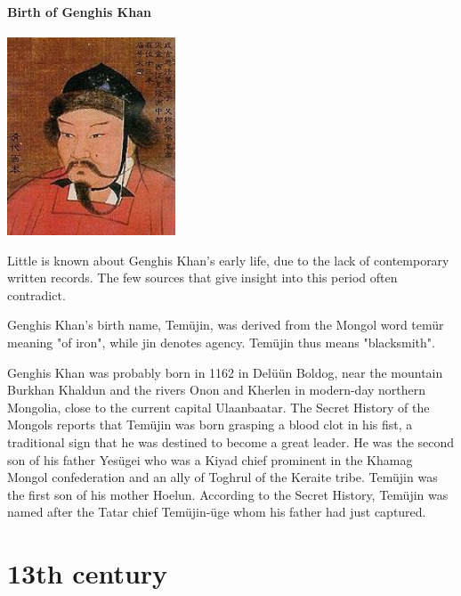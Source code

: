\documentclass[11pt]{report}
\begin{document}
\subsection{Birth of Genghis Khan}
\vspace{2mm}\begin{center}\includegraphics[width=5cm]{./img/gengishKhan.jpg}\end{center}
Little is known about Genghis Khan's early life, due to the lack of contemporary written records. The few sources that give insight into this period often contradict.

Genghis Khan's birth name, Temüjin, was derived from the Mongol word temür meaning "of iron", while jin denotes agency. Temüjin thus means "blacksmith".

Genghis Khan was probably born in 1162 in Delüün Boldog, near the mountain Burkhan Khaldun and the rivers Onon and Kherlen in modern-day northern Mongolia, close to the current capital Ulaanbaatar. The Secret History of the Mongols reports that Temüjin was born grasping a blood clot in his fist, a traditional sign that he was destined to become a great leader. He was the second son of his father Yesügei who was a Kiyad chief prominent in the Khamag Mongol confederation and an ally of Toghrul of the Keraite tribe. Temüjin was the first son of his mother Hoelun. According to the Secret History, Temüjin was named after the Tatar chief Temüjin-üge whom his father had just captured.


										
	
\part{13th century}
\section{}
\end{document}
